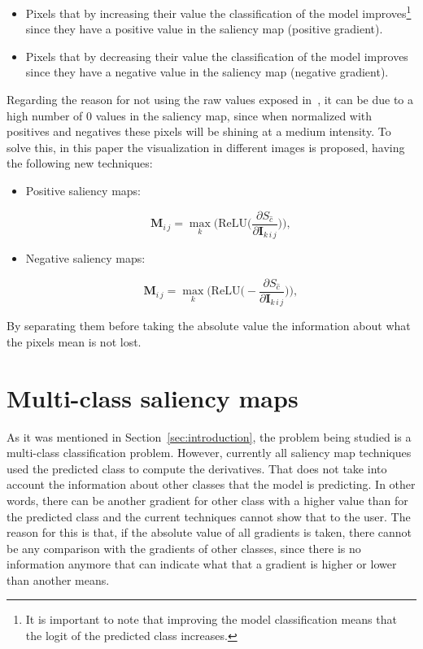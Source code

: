 \documentclass[preprint,12pt]{elsarticle}
\begin{document}
\begin{itemize}
    \item Pixels that by increasing their value the classification of the model improves\footnote{It is important to note that improving the model classification means that the logit of the predicted class increases. } since they have a positive value in the saliency map (positive gradient).
    \item Pixels that by decreasing their value the classification of the model improves since they have a negative value in the saliency map (negative gradient).
\end{itemize}

Regarding the reason for not using the raw values exposed in~\cite{smilkovSmoothGradRemovingNoise}, it can be due to a high number of 0 values in the saliency map, since when normalized with positives and negatives these pixels will be shining at a medium intensity. To solve this, in this paper the visualization in different images is proposed, having the following new techniques:

\begin{itemize}
    \item Positive saliency maps:
    
    \begin{equation}
        \boldsymbol{M}_{i\, j} = \max_{k} \bigg ( \text{ReLU} \bigg (\frac{\partial S_{\hat{c}}}{\partial \boldsymbol{I}_{k\, i\, j}} \bigg ) \bigg ),
        \label{eq: positive saliency map}
    \end{equation}

    \item Negative saliency maps:
    
    \begin{equation}
      \boldsymbol{M}_{i\, j} = \max_{k} \bigg ( \text{ReLU} \bigg ( - \frac{\partial S_{\hat{c}}}{\partial \boldsymbol{I}_{k\, i\, j}} \bigg ) \bigg ),
      \label{eq: negative saliency map}
  \end{equation}

\end{itemize}

By separating them before taking the absolute value the information about what the pixels mean is not lost. 

\section{Multi-class saliency maps}
\label{sec:multi-class saliency map}
As it was mentioned in Section~\ref{sec:introduction}, the problem being studied is a multi-class classification problem. However, currently all saliency map techniques used the predicted class to compute the derivatives. That does not take into account the information about other classes that the model is predicting. In other words, there can be another gradient for other class with a higher value than for the predicted class and the current techniques cannot show that to the user. The reason for this is that, if the absolute value of all gradients is taken, there cannot be any comparison with the gradients of other classes, since there is no information anymore that can indicate what that a gradient is higher or lower than another means.
\end{document}
